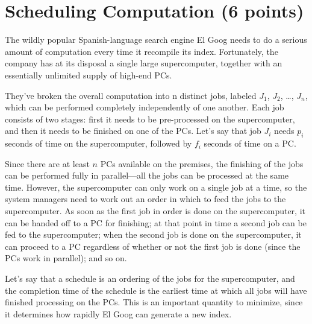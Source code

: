 \documentclass[letter,11pt]{article}
\begin{document}
\newpage


\section{Scheduling Computation (6 points)}


The wildly popular Spanish-language search engine El Goog needs to do a serious amount of computation every time it recompile its index. Fortunately, the company has at its disposal a single large supercomputer, together with an essentially unlimited supply of high-end PCs.

They've broken the overall computation into n distinct jobs, labeled $J_1$, $J_2$, \dots, $J_n$, which can be performed completely independently of one another. Each job consists of two stages: first it needs to be pre-processed on the supercomputer, and then it needs to be finished on one of the PCs. Let’s say that job $J_i$ needs $p_i$ seconds of time on the supercomputer, followed by $f_i$ seconds of time on a PC.

Since there are at least $n$ PCs available on the premises, the finishing of the jobs can be performed fully in parallel—all the jobs can be processed at the same time. However, the supercomputer can only work on a single job at a time, so the system managers need to work out an order in which to feed the jobs to the supercomputer. As soon as the first job in order is done on the supercomputer, it can be handed off to a PC for finishing; at that point in time a second job can be fed to the supercomputer; when the second job is done on the supercomputer, it can proceed to a PC regardless of whether or not the first job is done (since the PCs work in parallel); and so on.

Let's say that a schedule is an ordering of the jobs for the supercomputer, and the completion time of the schedule is the earliest time at which all jobs will have finished processing on the PCs. This is an important quantity to minimize, since it determines how rapidly El Goog can generate a new index.\\
\end{document}
